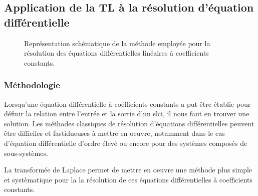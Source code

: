 \subsection[Application de la transformée de Laplace]
           {Application de la TL à la résolution d'équation différentielle}
\begin{figure}[!ht]
    \centering
    
    \caption{Représentation schématique de la méthode employée pour la 
             résolution des équations différentielles linéaires à 
             coefficients constants.\label{fig-laplace_schema}}
\end{figure}
\subsubsection{Méthodologie}
Lorsqu'une équation différentielle à coéfficients constants a put être établie
pour définir la relation entre l'entrée et la sortie d'un \gls{slci}, il 
nous faut en trouver une solution. Les méthodes classiques de résolution 
d'équations différentielles peuvent être difficiles et fastidueuses à mettre 
en oeuvre, notamment dans le cas d'équation différentielle d'ordre élevé 
ou encore pour des systèmes composés de sous-systèmes.

La transformée de Laplace permet de mettre en oeuvre une méthode plus simple et 
systèmatique  pour la la résolution de ces équations différentielles à 
coefficients constants.

